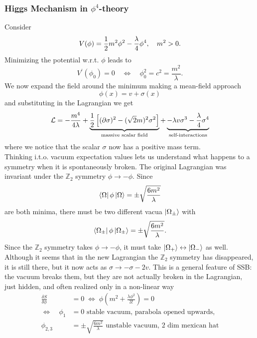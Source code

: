 \subsubsection{Higgs Mechanism in $\phi^4$-theory}
Consider 
\begin{equation*}
V(\phi) = \frac{1}{2} m^2 \phi^2 - \frac{\lambda}{4}\phi^4,\quad m^2>0.
\end{equation*}
Minimizing the potential w.r.t. $\phi$ leads to 
\begin{equation}
	V^\prime(\phi_0)=0 \quad \Leftrightarrow \quad \phi^2_0 = c^2 = \frac{m^2}{\lambda}.
\end{equation}
We now expand the field around the minimum making a mean-field approach
\begin{equation}
\phi(x)=v + \sigma(x) 
\end{equation}
and substituting in the Lagrangian we get
\begin{equation}
	 \mathcal{L} = -\frac{m^4}{4 \lambda} + \underbrace{\frac{1}{2} \left[(\partial \sigma)^2 -(\sqrt{2} m)^2 \sigma^2\right]}_{\text{massive scalar field}} + \underbrace{-\lambda v \sigma^3 - \frac{\lambda}{4} \sigma^4}_{\text{self-interactions}}
\end{equation}
where we notice that the scalar $\sigma$ now has a positive mass term.\\
Thinking i.t.o. vacuum expectation values lets us understand what happens to a symmetry when it is spontaneously broken. The original Lagrangian was invariant under the $\mathbb{Z}_2$ symmetry $\phi\rightarrow - \phi$. Since
\begin{equation}
	\bra{\Omega}\phi \ket{\Omega} = \pm \sqrt{\frac{6 m^2}{\lambda}} 
\end{equation}
are both minima, there must be two different vacua $\ket{\Omega_\pm}$ with
\begin{equation}
	\bra{\Omega_\pm}\phi \ket{\Omega_\pm} = \pm \sqrt{\frac{6 m^2}{\lambda}}.
\end{equation}
Since the $\mathbb{Z}_2$ symmetry takes $\phi\rightarrow-\phi$, it must take $\ket{\Omega_+}\leftrightarrow \ket{\Omega_-}$ as well. Although it seems that in the new Lagrangian the $\mathbb{Z}_2$ symmetry has disappeared, it is still there, but it now acts as $\sigma \rightarrow - \sigma-2v$. This is a general feature of SSB:\\
the vacuum breaks them, but they are not actually broken in the Lagrangian, just hidden, and often realized only in a non-linear way
\begin{align*}
	\frac{\delta S}{\delta \phi} &= 0 \; \Leftrightarrow \; \phi ( m^2 + \frac{\lambda \phi^2}{3!}) = 0 \\
	 \Leftrightarrow \quad \phi_1&=0 \text{ stable vacuum, parabola opened upwards},\\
	 \phi_{2,3} &= \pm \sqrt{\frac{6 m^2}{\lambda}} \text{ unstable vacuum, 2 dim mexican hat}
\end{align*}
















